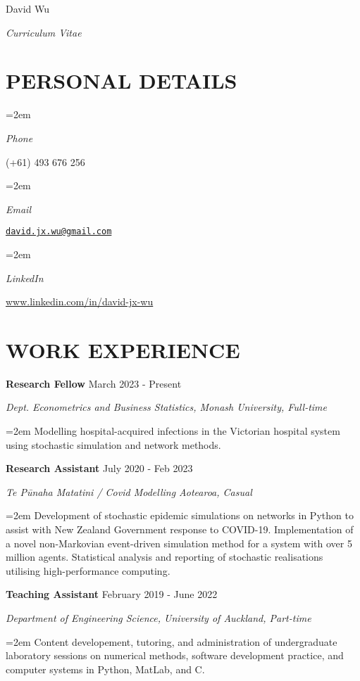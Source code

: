 \documentclass[paper=a4paper,fontsize=11pt]{scrartcl} %
\newlength{\spacebox}
\newcommand{\MyName}[1]{ %
		\Huge \usefont{T1}{phv}{b}{n} \hfill #1
		\par \normalsize \normalfont}
\newcommand{\MySlogan}[1]{ %
		\large \usefont{T1}{phv}{m}{n}\hfill \textit{#1}
		\par \normalsize \normalfont}
\newcommand{\NewPart}[1]{\section*{\uppercase{#1}}}
\newcommand{\PersonalEntry}[2]{
		\noindent\hangindent=2em\hangafter=0 %
		\parbox{\spacebox}{        %
		\textit{#1}}		       %
		\hspace{1.5em} #2 \par}    %
\newcommand{\EducationEntry}[4]{
		\noindent \textbf{#1} \hfill      %
		{#2} \par  %
		\noindent \textit{#3} \par        %
		\noindent\hangindent=2em\hangafter=0 \small #4 %
		\normalsize \par\par}
\newcommand{\WorkEntry}[4]{				  %
		\noindent \textbf{#1} \hfill      %
		{#2} \par  %
		\noindent \textit{#3} \par              %
		\noindent\hangindent=2em\hangafter=0 \small #4 %
		\normalsize \par\par}
\begin{document}
\vspace*{-1cm}
\MyName{David Wu}
\MySlogan{Curriculum Vitae}

\NewPart{Personal Details}

\PersonalEntry{Phone}{(+61) 493 676 256}
\PersonalEntry{Email}{\href{mailto:david.jx.wu@gmail.com}{\texttt{david.jx.wu@gmail.com}}}
\PersonalEntry{LinkedIn}{\url{www.linkedin.com/in/david-jx-wu}}

\NewPart{Work experience}

\WorkEntry{Research Fellow}{March 2023 - Present}{Dept. Econometrics and Business Statistics, Monash University, Full-time}{Modelling hospital-acquired infections in the Victorian hospital system using stochastic simulation and network methods.}


\WorkEntry{Research Assistant}{July 2020 - Feb 2023}{Te P\={u}naha Matatini / Covid Modelling Aotearoa, Casual}{Development of stochastic epidemic simulations on networks in Python to assist with New Zealand Government response to COVID-19. Implementation of a novel non-Markovian event-driven simulation method for a system with over 5 million agents. Statistical analysis and reporting of stochastic realisations utilising high-performance computing.}

\WorkEntry{Teaching Assistant}{February 2019 - June 2022}{Department of Engineering Science, University of Auckland, Part-time}{Content developement, tutoring, and administration of undergraduate laboratory sessions on numerical methods, software development practice, and computer systems in Python, MatLab, and C.} %
\end{document}

